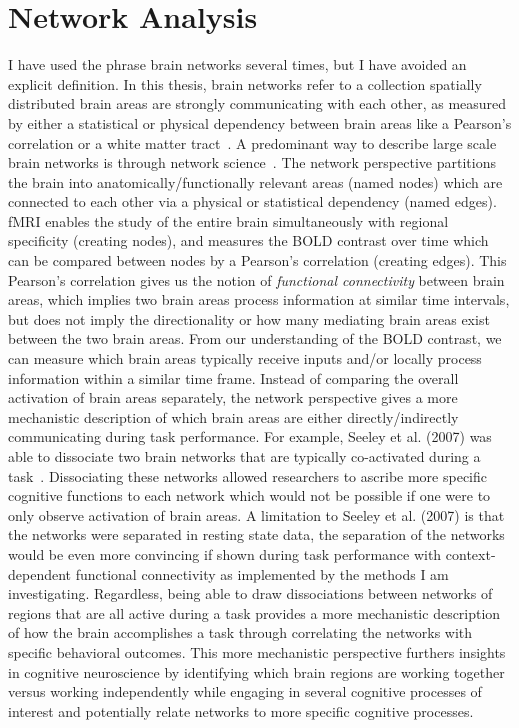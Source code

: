 \documentclass[phd,figures,tables,ackpage,abstractpage,publicabstractpage]{uithesis}
\begin{document}
\section{Network Analysis}

I have used the phrase brain networks several times, but I have avoided an explicit definition.
In this thesis, brain networks refer to a collection spatially distributed brain areas
are strongly communicating with each other, as measured by either a
statistical or physical dependency between
brain areas like a Pearson's correlation or a white matter tract~\cite{Uddin2019}.
A predominant way to describe large scale brain networks is through network science~\cite{Rubinov2010}.
The network perspective partitions the brain into anatomically/functionally relevant areas (named nodes)
which are connected to each other via a physical or statistical dependency (named edges).
fMRI enables the study of the entire brain simultaneously with regional specificity (creating nodes),
and measures the BOLD contrast over time which can be compared between nodes by a Pearson's correlation (creating edges).
This Pearson's correlation gives us the notion of \textit{functional connectivity} between brain areas,
which implies two brain areas process information at similar time intervals, but does not imply
the directionality or how many mediating brain areas exist between the two brain areas.
From our understanding of the BOLD contrast, we can measure which brain areas
typically receive inputs and/or locally process information within a similar time frame.
Instead of comparing the overall activation of brain areas separately, the network perspective
gives a more mechanistic description of which brain areas are either directly/indirectly
communicating during task performance.
For example, Seeley et al. (2007) was able to dissociate two brain networks that are typically
co-activated during a task~\cite{Seeley2007}.
Dissociating these networks allowed researchers to ascribe more specific cognitive functions
to each network which would not be possible if one were to only observe activation of brain areas.
A limitation to Seeley et al. (2007) is that the networks were separated in resting state data,
the separation of the networks would be even more convincing if shown during task performance
with context-dependent functional connectivity as implemented by the methods I am
investigating.
Regardless, being able to draw dissociations between networks of regions that are all active
during a task provides a more mechanistic description of how the brain accomplishes a task
through correlating the networks with specific behavioral outcomes.
This more mechanistic perspective furthers insights in cognitive neuroscience by identifying
which brain regions are working together versus working independently while engaging
in several cognitive processes of interest and potentially relate networks to more specific
cognitive processes.
\end{document}
